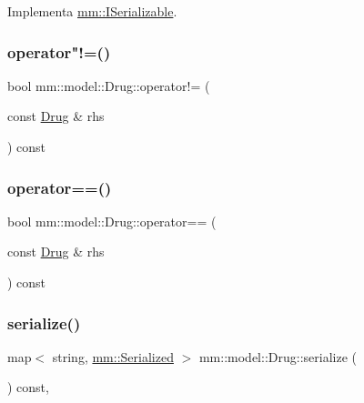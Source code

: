 Implementa \hyperlink{classmm_1_1_i_serializable_a9717e6da47fcbac3ffa2e68152464e0a}{mm\+::\+I\+Serializable}.

\mbox{\label{classmm_1_1model_1_1_drug_a51d9c5692835cab9d206580ccf8d0e1e}} 
\subsubsection{\texorpdfstring{operator"!=()}{operator!=()}}
{\footnotesize\ttfamily bool mm\+::model\+::\+Drug\+::operator!= (\begin{DoxyParamCaption}\item[{const \hyperlink{classmm_1_1model_1_1_drug}{Drug} \&}]{rhs }\end{DoxyParamCaption}) const}

\mbox{\label{classmm_1_1model_1_1_drug_a15151e60eef91b544c63d8ff55db7bab}} 
\subsubsection{\texorpdfstring{operator==()}{operator==()}}
{\footnotesize\ttfamily bool mm\+::model\+::\+Drug\+::operator== (\begin{DoxyParamCaption}\item[{const \hyperlink{classmm_1_1model_1_1_drug}{Drug} \&}]{rhs }\end{DoxyParamCaption}) const}

\mbox{\label{classmm_1_1model_1_1_drug_a5d4fa5bf5e4700f833547c5114764c7b}} 
\subsubsection{\texorpdfstring{serialize()}{serialize()}}
{\footnotesize\ttfamily map$<$ string, \hyperlink{structmm_1_1_serialized}{mm\+::\+Serialized} $>$ mm\+::model\+::\+Drug\+::serialize (\begin{DoxyParamCaption}{ }\end{DoxyParamCaption}) const\hspace{0.3cm}{\ttfamily [override]}, {\ttfamily [virtual]}}



